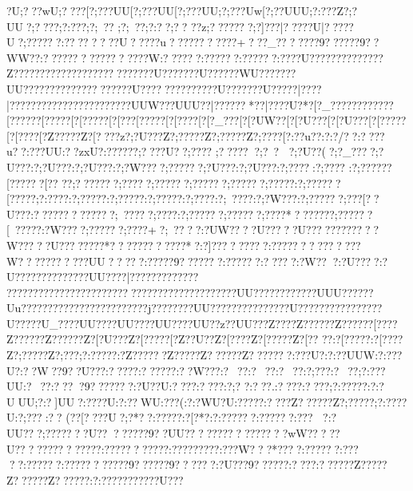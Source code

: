 {{{{{{{{{{{{{{{{{{{{{{{{{{{{{{{{{{{{{{{{{{{{{{{{{{{{{{{{{{{{{{{{{{{{{{{{{{{{{{{{{{{{{{{{{{{{{{{{{{{{{{{{{{{{{{{{{{{{{{{{{{{{{{{{{{{{{{{{{{{{{{{{{{{{{{{{{{{{{{{{{{{{{{{{{{{{{{{{{{{{{{{{{{{{{{{{{{{{{{{{{{{{{{{{{{{{{{{{{{{{{{{{{{{{{{{{{{{{{{{{{{{{{{{{{{{{{{{{{{{{{{{{{{{{{{{{{{{{{{{{{{{{{{{{{{{{{{{{{{{{{{{{{{{{{{{{{{{{{{{{{{{{{{{{{{{{{{{{{{{{{{{{{{{{{{{{{{{{{{{{{{{{{{{{{{{{{{{{{{{{{{{{{{{{{{{{{{{{{{{{{{{{{{{{{{{{{{{{{{{{{{{{{{{{{{{{{{{{{{{{{{{{{{{{{{{{{{{{{{{{{{{{{{{{{{{{{{{{{{{{{{{{{{{{{{{{{{{{{{?U;?? ?wU;??  ??[?;???UU[?;???UU[?;???UU;?;???Uw[?;??UUU;?:?  ??Z?;?UU?;??  ??;?:?  ??;?;~??
 ;?;~??  ;?:?  ?;?? ??z;???????;?]???|?????U|?????U?;??????:????????U?????u???????????+???_???????9??????9??WW??:?????????????????W:????? ?:??????:??????:????U???? ??????????Z????????{???????{???????????U???????U??????WU??{?????UU?????????????? {??????U??{??? ?????   ????U???????U?????|??   ??|???  ??{???  ??{???????{???? {?{?UUW?{?{?UUU?{?|???? {?{?*? {?|??   {?{?U?* {?[?_???{?\???? {?\???? {?[?????{?[?????[?[?????[?[???  [?{???? [?[????[?[?_???[?[?UW??[?[?U???[?[?U???[?[?????[?[????[?Z?????Z?[????z?;?U???Z?;?????Z?;?????Z?;????[?:??u??:?:?/??:????u??:???UU:??zxU?:?????? ;????U??;????
;??????;?~?
?;?U??(?;?_????;?U???:?;?U???:?;?U???:?;?W????;??????;?U???:?;?U???:?;????:?;???? :?;???? ??[??????[??
??;???????;?????;??????;??????;??????;?????:?;??????[?????;?:? ???:?;?????:?;?????:?;?????:?;?}???:?;~????:?;?W???:?;??????;???[??U???:?????????????;~?????;????:?;??????;??????;????*???????;??????[~? ????:?W????;??????;????+?;~????:?UW????U?????U????????????W?????U????????*????????????*?:?]????? ????:??????????????W???????????UU?????:?????9???????:??????:?????:?W???:?U????:?U?????{?????????UU????|? ?? ???? ?? ???? ????? ??????????????????????????????????????UU????{?????{???UUU??????Uu????? ?  ??????????{???????{?j???{?????UU{???????{???????{?U???{?{?? ??{?{?????{?{?U???{?{?U_??{?{?UU??{?{?UU??{?{?UU??{?{?UU??z?{?UU??{?Z? ???Z?{?????Z?{?????[?{???Z?{?????Z?{?????Z?[?U???Z?[?????[?Z??U??Z?[????Z?[?????Z?[??
??:?[?????:?[???? Z?;?????Z?;???;?:?????:?Z??????Z?????Z??????Z???????:???U?:?:??UUW:?:???U?:??W??9??U???:????? :??????:??W???:?~??  :?~??  :?~??  :?;???  :?~??  ;?:???UU:?~??  :????9???????:?U??U:????:????  :?;?
?  :??  ?.:????  :????  ;?:?????:?:?UUU;?:?]UU?:????U:?:??WU:??? (  :?:?WU?U:?????  :????  Z??????Z?;?????;?:????U:?;??? :??
(??[????}U?;?*?  ?:?????:?[? *? :?:??????:??????:???
?:?UU???;???????U????????9??UU????????????????wW?????U??????????????:???????????:?????????:???W???*????:??????:?????:??????:???????????9??????9??????:?U???9??????:????:??????Z?????Z??????Z??????:?:?????{??????U??{?
}}}}}}}}}}}}}}}}}}}}}}}}}}}}}}}}}}}}}}}}}}}}}}}}}}}}}}}}}}}}}}}}}}}}}}}}}}}}}}}}}}}}}}}}}}}}}}}}}}}}}}}}}}}}}}}}}}}}}}}}}}}}}}}}}}}}}}}}}}}}}}}}}}}}}}}}}}}}}}}}}}}}}}}}}}}}}}}}}}}}}}}}}}}}}}}}}}}}}}}}}}}}}}}}}}}}}}}}}}}}}}}}}}}}}}}}}}}}}}}}}}}}}}}}}}}}}}}}}}}}}}}}}}}}}}}}}}}}}}}}}}}}}}}}}}}}}}}}}}}}}}}}}}}}}}}}}}}}}}}}}}}}}}}}}}}}}}}}}}}}}}}}}}}}}}}}}}}}}}}}}}}}}}}}}}}}}}}}}}}}}}}}}}}}}}}}}}}}}}}}}}}}}}}}}}}}}}}}}}}}}}}}}}}}}}}}}}}}}}}}}}}}}}}}}}}}}}}}}}}}}}}}}}}}}}}}}}}}}}}}}}}}}}}}}}}}}}}}}}}}}}}}}}}}}}}}}}}}}}}}}}}}}}}}}}}}}}}}}}}}}}}}}}}}}}}}}}
